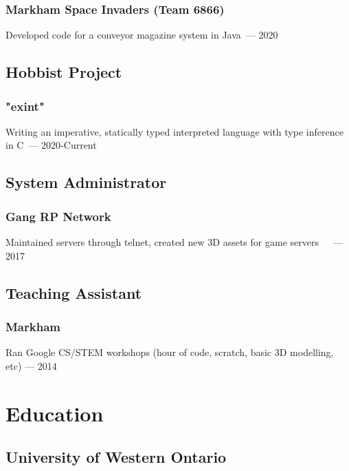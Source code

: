 \documentclass{article}
\begin{document}
\subsubsection{Markham Space Invaders (Team 6866)} Developed code for a conveyor magazine system in Java\ --- 2020

\subsection{Hobbist Project}
\subsubsection{"exint"} Writing an imperative, statically typed interpreted language with type inference in C\ --- 2020\--Current


\subsection{System Administrator}
\subsubsection{Gang RP Network} Maintained servers through telnet, created new 3D assets for game servers\ \ \ --- 2017

\subsection{Teaching Assistant}
\subsubsection{Markham}
Ran Google CS/STEM workshops (hour of code, scratch, basic 3D modelling, etc) --- 2014  


\section{Education}
\subsection{University of Western Ontario}
\end{document}
